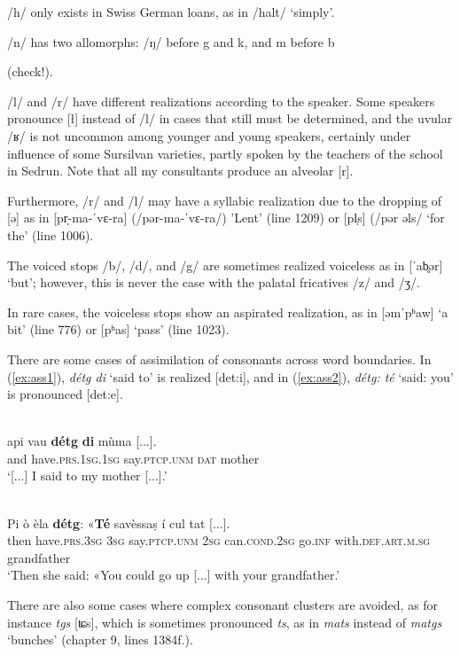 /h/ only  exists in Swiss German loans, as in /halt/ `simply'.

/n/ has two allomorphs: /ŋ/ before g and k, and m before b 

(check!).
 
/l/ and /r/ have different realizations according to the speaker. Some speakers pronounce [ł] instead of /l/ in  cases that still must be determined, and the uvular /ʁ/ is not uncommon among younger and young speakers, certainly under influence of some Sursilvan varieties, partly spoken by the teachers of the school in Sedrun. Note that all my consultants produce an alveolar [r].

Furthermore, /r/ and /l/ may have a syllabic realization due to the dropping of [ə] as in [pr̩-ma-ˈvɛ-ra] (/pər-ma-ˈvɛ-ra/) 'Lent' (line 1209) or [pl̩s] (/pər əls/ `for the' (line 1006).

The voiced stops /b/, /d/, and /g/ are sometimes realized voiceless as in [ˈab̥ər] `but'; however, this is never the case with the palatal fricatives /z/ and /ʒ/.

In rare cases, the voiceless stops show an aspirated realization, as in [əmˈpʰaw] `a bit' (line 776) or [pʰas] `pass' (line 1023).

There are some cases of assimilation of consonants across word boundaries. In (\ref{ex:ass1}), \textit{détg di} `said to' is realized [det:i], and in (\ref{ex:ass2}), \textit{détg: té} `said: you' is pronounced [det:e].


\ea\label{ex:ass1}
\\
\gll [...] api vau \textbf{détg} \textbf{di} mùma [...].\\
{} and have.\textsc{prs.1sg.1sg} say.\textsc{ptcp.unm} \textsc{dat} mother\\
\glt `[...] I said to my mother [...].'
\z

\ea\label{ex:ass2}
\\
\gll Pi ò èla \textbf{détg}: «\textbf{Té} savèssaṣ í cul tat [...].\\
then have.\textsc{prs.3sg} \textsc{3sg} say.\textsc{ptcp.unm} \textsc{2sg} can.\textsc{cond.2sg} go.\textsc{inf}  with.\textsc{def.art.m.sg} grandfather\\
\glt `Then she said: «You could go up [...] with your grandfather.'
\z

There are also some cases where complex consonant clusters are avoided, as for instance \textit{tgs} [ʨs], which is sometimes pronounced \textit{ts}, as in \textit{mats} instead of \textit{matgs} `bunches' (chapter 9, lines 1384f.).

